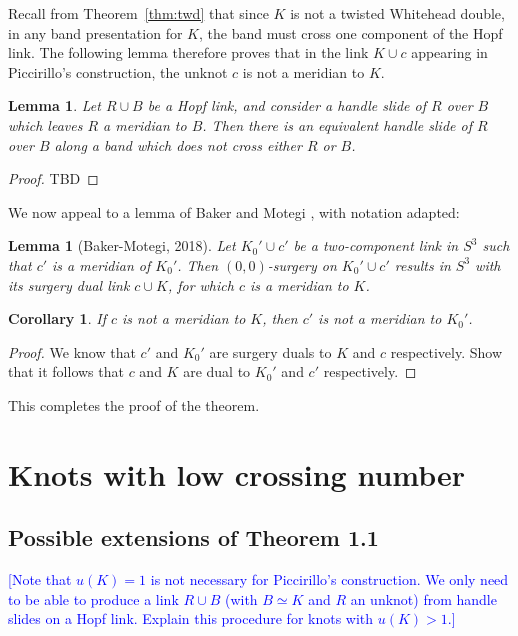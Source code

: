 \documentclass[11pt,usenames,dvipsnames,reqno]{amsart}
\numberwithin{theorem}{section}
\newtheorem{corollary}[theorem]{Corollary}
\newtheorem{lemma}[theorem]{Lemma}
\theoremstyle{ex}
\theoremstyle{rem}
\def\kh#1{\textcolor{Blue}{#1}}
\begin{document}
Recall from Theorem~\ref{thm:twd} that since $K$ is not a twisted Whitehead double, in any band presentation for $K$, the band must cross one component of the Hopf link. The following lemma therefore proves that in the link $K\cup c$ appearing in Piccirillo's construction, the unknot $c$ is not a meridian to $K$.

\begin{lemma}
	Let $R\cup B$ be a Hopf link, and consider a handle slide of $R$ over $B$ which leaves $R$ a meridian to $B$. Then there is an equivalent handle slide of $R$ over $B$ along a band which does not cross either $R$ or $B$.
\end{lemma}
\begin{proof}
	TBD
\end{proof}

We now appeal to a lemma of Baker and Motegi \cite[Lemma 2.4]{baker-motegi}, with notation adapted:

\begin{lemma}[Baker-Motegi, 2018]
	Let $K_0'\cup c'$ be a two-component link in $S^3$ such that $c'$ is a meridian of $K_0'$. Then $(0,0)$-surgery on $K_0'\cup c'$ results in $S^3$ with its surgery dual link $c\cup K$, for which $c$ is a meridian to $K$.
\end{lemma}

\begin{corollary}
	If $c$ is not a meridian to $K$, then $c'$ is not a meridian to $K_0'$.
\end{corollary}

\begin{proof}
	We know that $c'$ and $K_0'$ are surgery duals to $K$ and $c$ respectively. Show that it follows that $c$ and $K$ are dual to $K_0'$ and $c'$ respectively.
\end{proof}
This completes the proof of the theorem.

\section{Knots with low crossing number}

\subsection{Possible extensions of Theorem 1.1} \kh{[Note that $u(K)=1$ is not necessary for Piccirillo's construction. We only need to be able to produce a link $R\cup B$ (with $B\simeq K$ and $R$ an unknot) from handle slides on a Hopf link. Explain this procedure for knots with $u(K)>1$.]}
\end{document}
